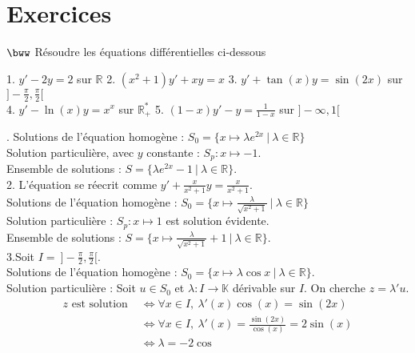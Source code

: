 \documentclass[11pt]{article}
\begin{document}
\section{Exercices}

\begin{exercice}{$\bww$}{}
    Résoudre les équations différentielles ci-dessous
    \begin{center}
        1. $y' - 2y = 2$ sur $\mathbb{R}$ \hspace{0.5cm} 2. $(x^2+1)y'+xy=x$ \hspace{0.5cm} 3. $y' + \tan(x)y = \sin(2x)$ sur $]-\frac{\pi}{2}, \frac{\pi}{2}[$\\
        4. $y'-\ln(x)y = x^x$ sur $\mathbb{R}_+^*$ \hspace{1cm} 5. $(1-x)y' - y = \frac{1}{1-x}$ sur $]-\infty, 1[$
    \end{center}
    . Solutions de l'équation homogène : $S_0=\{x\mapsto\lambda e^{2x} ~ | ~ \lambda\in\mathbb{R}\}$\\
    Solution particulière, avec $y$ constante : $S_p : x\mapsto -1$.\\
    Ensemble de solutions : $S = \{\lambda e^{2x} - 1 ~ | ~ \lambda\in\mathbb{R}\}$.\\[0.2cm]
    2. L'équation se réecrit comme $y' + \frac{x}{x^2+1}y=\frac{x}{x^2+1}$.\\
    Solutions de l'équation homogène : $S_0 = \{x\mapsto\frac{\lambda}{\sqrt{x^2+1}} ~ | ~ \lambda \in \mathbb{R}\}$\\
    Solution particulière : $S_p:x\mapsto1$ est solution évidente.\\
    Ensemble de solutions : $S = \{x\mapsto\frac{\lambda}{\sqrt{x^2+1}}+1 ~ | ~ \lambda\in\mathbb{R}\}$.\\[0.2cm]
    3.Soit $I = ~ ]-\frac{\pi}{2}, \frac{\pi}{2}[$.\\
    Solutions de l'équation homogène : $S_0 = \{x\mapsto \lambda \cos x ~ | ~ \lambda \in \mathbb{R}\}$.\\
    Solution particulière : Soit $u\in S_0$ et $\lambda:I\rightarrow\mathbb{K}$ dérivable sur $I$. On cherche $z=\lambda'u$.
    \begin{align*}
        z \text{ est solution } &\iff \forall{x\in I}, ~ \lambda'(x)\cos(x) = \sin(2x)\\
        &\iff \forall{x}\in I, ~ \lambda'(x) = \frac{\sin(2x)}{\cos(x)}=2\sin(x)\\
        &\iff \lambda =-2\cos
    \end{align*}

\end{exercice}
\end{document}
